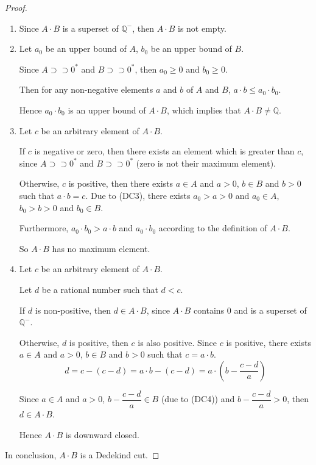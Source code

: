 \documentclass[class=mike-apostol-mathematical-analysis,crop=false]{standalone}
\begin{document}
\begin{proof}
    \begin{enumerate}[label = (\roman*)]
        \item Since $A\cdot B$ is a superset of $\mathbb{Q}^{-}$, then $A\cdot B$ is not empty.
        \item Let $a_{0}$ be an upper bound of $A$, $b_{0}$ be an upper bound of $B$.
              \par Since $A\supset\supset{0}^{*}$ and $B\supset\supset{0}^{*}$, then $a_{0}\ge 0$ and $b_{0}\ge 0$.
              \par Then for any non-negative elements $a$ and $b$ of $A$ and $B$, $a\cdot b \le a_{0}\cdot b_{0}$.
              \par Hence $a_{0}\cdot b_{0}$ is an upper bound of $A\cdot B$, which implies that $A\cdot B\ne\mathbb{Q}$.
        \item Let $c$ be an arbitrary element of $A\cdot B$.
              \par If $c$ is negative or zero, then there exists an element which is greater than $c$, since $A\supset\supset {0}^{*}$ and $B\supset\supset {0}^{*}$ (zero is not their maximum element).
              \par Otherwise, $c$ is positive, then there exists $a\in A$ and $a > 0$, $b\in B$ and $b > 0$ such that $a\cdot b = c$. Due to (DC3), there exists $a_{0} > a > 0$ and $a_{0}\in A$, $b_{0} > b > 0$ and $b_{0}\in B$.
              \par Furthermore, $a_{0}\cdot b_{0} > a\cdot b$ and $a_{0}\cdot b_{0}$ according to the definition of $A\cdot B$.
              \par So $A\cdot B$ has no maximum element.
        \item Let $c$ be an arbitrary element of $A\cdot B$.
              \par Let $d$ be a rational number such that $d < c$.
              \par If $d$ is non-positive, then $d\in A\cdot B$, since $A\cdot B$ contains $0$ and is a superset of $\mathbb{Q}^{-}$.
              \par Otherwise, $d$ is positive, then $c$ is also positive. Since $c$ is positive, there exists $a\in A$ and $a > 0$, $b\in B$ and $b > 0$ such that $c = a\cdot b$.
              \[
                  d = c - (c - d) = a\cdot b - (c - d) = a\cdot\left(b - \frac{c - d}{a}\right)
              \]
              \par Since $a\in A$ and $a > 0$, $b - \dfrac{c - d}{a}\in B$ (due to (DC4)) and $b - \dfrac{c - d}{a} > 0$, then $d \in A\cdot B$.
              \par Hence $A\cdot B$ is downward closed.
    \end{enumerate}
    \par In conclusion, $A\cdot B$ is a Dedekind cut.
\end{proof}
\end{document}
